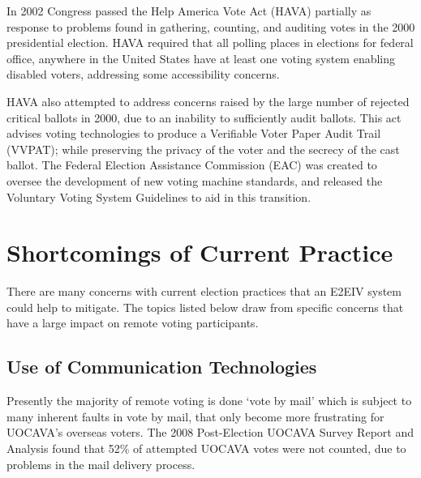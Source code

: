 In 2002 Congress passed the Help America Vote Act (HAVA) partially as response
to problems found in gathering, counting, and auditing votes in the 2000
presidential election. HAVA required that all polling places in elections for
federal office, anywhere in the United States have at least one voting system
enabling disabled voters, addressing some accessibility concerns.

HAVA also attempted to address concerns raised by the large number of rejected
critical ballots in 2000, due to an inability to sufficiently audit ballots.
This act advises voting technologies to produce a Verifiable Voter Paper Audit
Trail (VVPAT); while preserving the privacy of the voter and the secrecy of the
cast ballot. The Federal Election Assistance Commission (EAC) was created to
oversee the development of new voting machine standards, and released the
Voluntary Voting System Guidelines to aid in this transition.




\section{Shortcomings of Current Practice}

There are many concerns with current election practices that an E2EIV system
could help to mitigate. The topics listed below draw from specific concerns
that have a large impact on remote voting participants.

\subsection{Use of Communication Technologies}
Presently the majority of remote voting is done `vote by mail'  which is
subject to many inherent faults in vote by mail, that only become more
frustrating for UOCAVA's overseas voters. The 2008 Post-Election UOCAVA Survey
Report and Analysis found that 52\% of attempted UOCAVA votes were not counted,
due to problems in the mail delivery process. 

